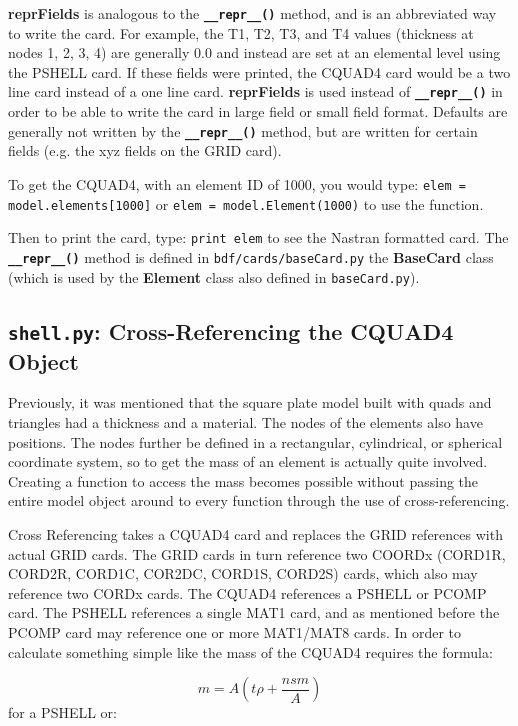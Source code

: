      {\bf reprFields} is analogous to the {\bf \tt \_\_repr\_\_()} method, and is an abbreviated way to write the card.  For example, the T1, T2, T3, and T4 values (thickness at nodes 1, 2, 3, 4) are generally 0.0 and instead are set at an elemental level using the PSHELL card.  If these fields were printed, the CQUAD4 card would be a two line card instead of a one line card.  {\bf reprFields} is used instead of {\bf \tt \_\_repr\_\_()} in order to be able to write the card in large field or small field format.  Defaults are generally not written by the {\bf \tt \_\_repr\_\_()} method, but are written for certain fields (e.g. the xyz fields on the GRID card).
    
     To get the CQUAD4, with an element ID of 1000, you would type:
       {\tt elem = model.elements[1000]} or
       {\tt elem = model.Element(1000)} to use the function.
     
     Then to print the card, type:
       {\tt print elem}
     to see the Nastran formatted card.  The {\bf \tt \_\_repr\_\_()} method is defined in {\tt bdf/cards/baseCard.py} the {\bf BaseCard} class (which is used by the {\bf Element} class also defined in {\tt baseCard.py}).

 \subsection{{\tt shell.py}: Cross-Referencing the CQUAD4 Object}
     Previously, it was mentioned that the square plate model built with quads and triangles had a thickness and a material.  The nodes of the elements also have positions.  The nodes further be defined in a rectangular, cylindrical, or spherical coordinate system, so to get the mass of an element is actually quite involved.  Creating a function to access the mass becomes possible without passing the entire model object around to every function through the use of cross-referencing.
     
     Cross Referencing takes a CQUAD4 card and replaces the GRID references with actual GRID cards.  The GRID cards in turn reference two COORDx (CORD1R, CORD2R, CORD1C, COR2DC, CORD1S, CORD2S) cards, which also may reference two CORDx cards.  The CQUAD4 references a PSHELL or PCOMP card.  The PSHELL references a single MAT1 card, and as mentioned before the PCOMP card may reference one or more MAT1/MAT8 cards.  In order to calculate something simple like the mass of the CQUAD4 requires the formula:
     
     {\begin{equation} m=A ( t\rho + \frac{nsm}{A} ) \end{equation} } for a PSHELL or:

